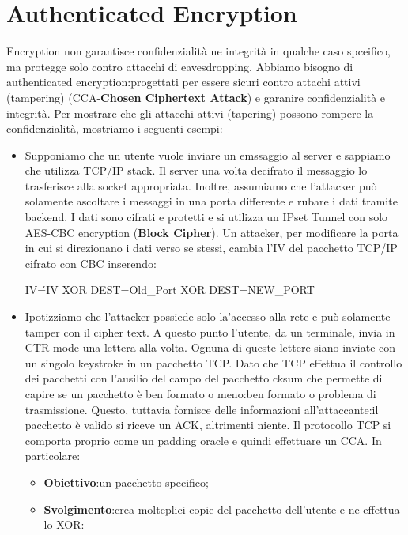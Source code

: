 \documentclass{book}
\theoremstyle{remark}
\begin{document}
\chapter{Authenticated Encryption}
Encryption non garantisce confidenzialità ne integrità in qualche caso spceifico, ma protegge solo contro attacchi di eavesdropping\@. Abbiamo bisogno di authenticated encryption:\@cipher progettati per essere sicuri contro attachi attivi (tampering) (CCA-\textbf{Chosen Ciphertext Attack}) e garanire confidenzialità e integrità\@.
Per mostrare che gli attacchi attivi (tapering) possono rompere la confidenzialità, mostriamo i seguenti esempi:
\begin{itemize}
	\item Supponiamo che un utente vuole inviare un emssaggio al server e sappiamo che utilizza TCP/IP stack\@. Il server una volta decifrato il messaggio lo trasferisce alla socket appropriata\@. Inoltre, assumiamo che l'attacker può solamente ascoltare i messaggi in una porta differente e rubare i dati tramite backend\@. I dati sono cifrati e protetti e si utilizza un IPset Tunnel con solo AES-CBC encryption (\textbf{Block Cipher})\@.
	      Un attacker, per modificare la porta in cui si direzionano i dati verso se stessi, cambia l'IV del pacchetto TCP/IP cifrato con CBC inserendo:
	      \begin{center}
		      IV\'=IV XOR DEST=Old\_Port XOR DEST=NEW\_PORT
	      \end{center}
	\item Ipotizziamo che l'attacker possiede solo la'accesso alla rete e può solamente tamper con il cipher text\@. A questo punto l'utente, da un terminale, invia in CTR mode una lettera alla volta\@. Ognuna di queste lettere siano inviate con un singolo keystroke in un pacchetto TCP\@. Dato che TCP effettua il controllo dei pacchetti con l'ausilio del campo del pacchetto cksum che permette di capire se un pacchetto è ben formato o meno:\@pacchetto ben formato o problema di trasmissione\@.
	      Questo, tuttavia fornisce delle informazioni all'attaccante:\@se il pacchetto è valido si riceve un ACK, altrimenti niente\@. Il protocollo TCP si comporta proprio come un padding oracle e quindi effettuare un CCA\@.
	      In particolare:
	      \begin{itemize}
		      \item \textbf{Obiettivo}:\@Decifrare un pacchetto specifico;\@
		      \item \textbf{Svolgimento}:\@Attacker crea molteplici copie del pacchetto dell'utente e ne effettua lo XOR:

\end{itemize}
\end{itemize}
\end{document}
